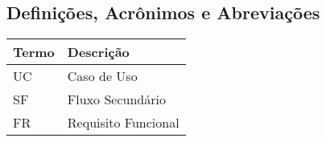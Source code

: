   \subsection{Definições, Acrônimos e Abreviações}
  \FloatBarrier
    \begin{table}[H] 
      \begin{center}
        \begin{tabular}[pos]{|m{2cm} | m{8cm}|} 
          \hline \cellcolor[gray]{0.9}\textbf{Termo} & \cellcolor[gray]{0.9}\textbf{Descrição} \\ \hline
          UC & Caso de Uso  \\ \hline
          SF & Fluxo Secundário \\ \hline
          FR & Requisito Funcional \\ \hline
        \end{tabular}
      \end{center}
    \label{tab:definicoes}
    \end{table}